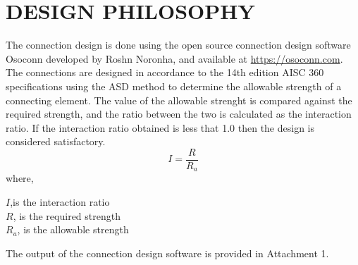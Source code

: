 \section{DESIGN PHILOSOPHY}
The connection design is done using the open source connection design software Osoconn 
developed by Roshn Noronha, and available at \url{https://osoconn.com}. The connections 
are designed in accordance to the 14th edition AISC 360 specifications using the ASD
method to determine the allowable strength of a connecting element.
The value of the allowable strenght is compared against the required strength, and the ratio 
between the two is calculated as the interaction ratio. If the interaction ratio obtained is 
less that 1.0 then the design is considered satisfactory.
\begin{equation}
    I = \frac{R}{R_a}
\end{equation}
where,

\null\quad\quad \(I\),is the interaction ratio\\
\null\quad\quad \(R\), is the required strength\\
\null\quad\quad \(R_a\), is the allowable strength

The output of the connection design software is provided in Attachment 1.


